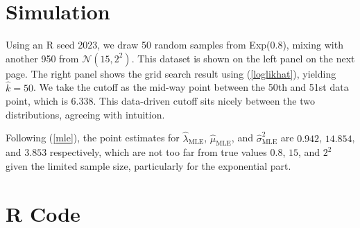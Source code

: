 \documentclass[a4paper,11pt,svgnames,dvipsnames]{article}
\newcommand{\mle}[1]{\widehat{#1}_\text{MLE}}
\renewcommand{\hat}{\widehat}
\begin{document}
\section{Simulation}

Using an \textsf{R} seed 2023, we draw 50 random samples from Exp(0.8), mixing with another 950 from $\mathcal{N}(15, 2^2)$. This dataset is shown on the left panel on the next page. The right panel shows the grid search result using (\ref{loglikhat}), yielding $\hat{k} = 50$. We take the cutoff as the mid-way point between the 50th and 51st data point, which is 6.338. This data-driven cutoff sits nicely between the two distributions, agreeing with intuition.

Following (\ref{mle}), the point estimates for $\mle{\lambda}$, $\mle{\mu}$, and $\mle{\sigma}^2$ are $0.942$, $14.854$, and $3.853$ respectively, which are not too far from true values $0.8$, $15$, and $2^2$ given the limited sample size, particularly for the exponential part.



\section{\textsf{R} Code}


\end{document}
